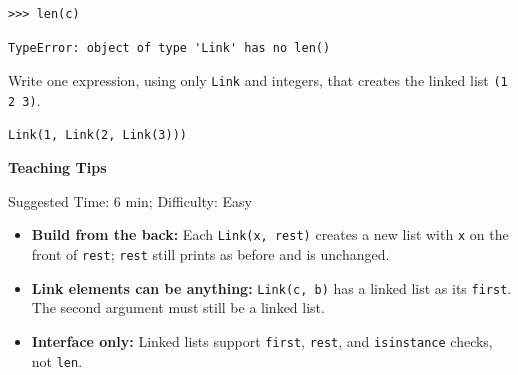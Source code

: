 \begin{blocksection}
\begin{lstlisting}
>>> len(c)
\end{lstlisting}
\begin{solution}[.35in]
\begin{lstlisting}
TypeError: object of type 'Link' has no len()
\end{lstlisting}
\end{solution}
\end{blocksection}

\begin{blocksection}
Write one expression, using only \lstinline{Link} and integers, that creates the linked list \lstinline{(1 2 3)}.
\begin{solution}[.5in]
\begin{lstlisting}
Link(1, Link(2, Link(3)))
\end{lstlisting}
\end{solution}
\end{blocksection}

\begin{questionmeta}
\textbf{Teaching Tips}\par\nopagebreak[4]
Suggested Time: 6 min; Difficulty: Easy
\nopagebreak[4]
\begin{itemize}
    \item \textbf{Build from the back:} Each \lstinline{Link(x, rest)} creates a new list with \lstinline{x} on the front of \lstinline{rest}; \lstinline{rest} still prints as before and is unchanged.
    \item \textbf{Link elements can be anything:} \lstinline{Link(c, b)} has a linked list as its \lstinline{first}. The second argument must still be a linked list.
    \item \textbf{Interface only:} Linked lists support \lstinline{first}, \lstinline{rest}, and \lstinline{isinstance} checks, not \lstinline{len}.
\end{itemize}
\end{questionmeta}
